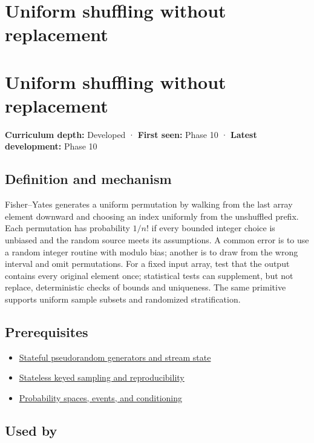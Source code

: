 \hypertarget{appendix-184fcc411663}{}
\section*{Uniform shuffling without replacement}
\section{Uniform shuffling without replacement}\label{appendix-184fcc411663-uniform-shuffling-without-replacement}

\textbf{Curriculum depth:} Developed · \textbf{First seen:} Phase 10 · \textbf{Latest development:} Phase 10

\subsection{Definition and mechanism}\label{appendix-184fcc411663-definition-and-mechanism}

Fisher--Yates generates a uniform permutation by walking from the last array element downward and choosing an index uniformly from the unshuffled prefix. Each permutation has probability \(1/n!\) if every bounded integer choice is unbiased and the random source meets its assumptions. A common error is to use a random integer routine with modulo bias; another is to draw from the wrong interval and omit permutations. For a fixed input array, test that the output contains every original element once; statistical tests can supplement, but not replace, deterministic checks of bounds and uniqueness. The same primitive supports uniform sample subsets and randomized stratification.

\subsection{Prerequisites}\label{appendix-184fcc411663-prerequisites}

\begin{itemize}
\tightlist
\item
  \hyperref[appendix-e0f7c7e08f3a]{Stateful pseudorandom generators and stream state}
\item
  \hyperref[appendix-daaf25bfd3a0]{Stateless keyed sampling and reproducibility}
\item
  \hyperref[appendix-f1ef323f6ed7]{Probability spaces, events, and conditioning}
\end{itemize}

\subsection{Used by}\label{appendix-184fcc411663-used-by}

